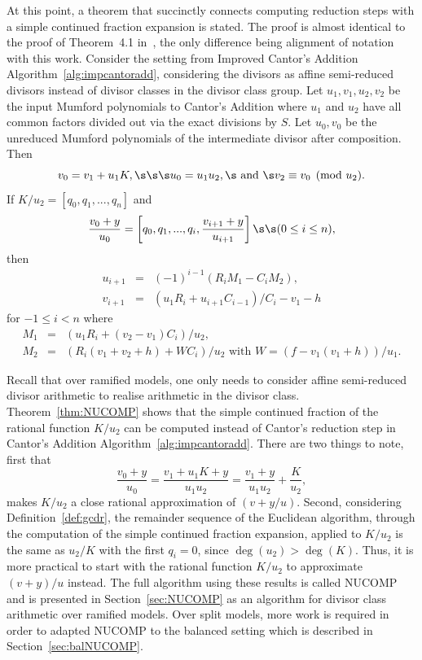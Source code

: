 At this point, a theorem that succinctly connects computing reduction steps with
a simple continued fraction expansion is stated. The proof is almost identical
to the proof of Theorem~4.1 in~\cite{ImbertJacobsonSchmidt_NUCOMP_2010}, the
only difference being alignment of notation with this work.
\bt\label{thm:NUCOMP} \cite[Adapted from
Theorem~4.1]{ImbertJacobsonSchmidt_NUCOMP_2010} Consider the setting from
Improved Cantor's Addition Algorithm~\ref{alg:impcantoradd}, considering the
divisors as affine semi-reduced divisors instead of divisor classes in the
divisor class group. Let $u_1,v_1, u_2,v_2$ be the input Mumford polynomials to
Cantor's Addition where $u_1$ and $u_2$ have all common factors divided out via
the exact divisions by $S$. Let $u_0,v_0$ be the unreduced Mumford polynomials of
the intermediate divisor after composition. Then
\begin{equation*}
v_0 = v_1 + u_1K, \s\s\s u_0 = u_1u_2, \s\mbox{ and }\s v_2 \equiv v_0 \pmod{u_2}.
\end{equation*} If $K/u_2 = [q_0,q_1,...,q_n]$ and \begin{equation*}
    \frac{v_0 + y}{u_0} = \left[q_0,q_1,...,q_i,\frac{v_{i+1} + y}{u_{i+1}}\right] \s\s (0 \leq i \leq n),
\end{equation*} then \begin{eqnarray*}
    u_{i+1} &=& (-1)^{i-1}(R_iM_1 - C_iM_2),\\
    v_{i+1} &=& (u_1R_i + u_{i+1}C_{i-1})/C_i - v_1 - h
\end{eqnarray*} for $-1 \leq i < n$ where \begin{eqnarray*}
    M_1 &=& (u_1R_i + (v_2 - v_1)C_i)/u_2,\\
    M_2 &=& (R_i(v_1 + v_2 + h) + WC_i)/u_2 \mbox{ with } W = (f - v_1(v_1 + h))/u_1. 
\end{eqnarray*}
\et

Recall that over ramified models, one only needs to consider affine
semi-reduced divisor arithmetic to realise arithmetic in the divisor class.
Theorem~\ref{thm:NUCOMP} shows that the simple continued fraction of the
rational function $K/u_2$ can be computed instead of Cantor's reduction step in
Cantor's Addition Algorithm~\ref{alg:impcantoradd}. There are two things to
note, first that $$\frac{v_0 + y}{u_0} = \frac{v_1 + u_1K + y}{u_1u_2} =
\frac{v_1 + y}{u_1u_2} + \frac{K}{u_2},$$ makes $K/u_2$ a close rational
approximation of $(v + y/u)$. Second, considering Definition~\ref{def:gcdr}, the
remainder sequence of the Euclidean algorithm, through the computation of the
simple continued fraction expansion, applied to $K/u_2$ is the same as $u_2/K$
with the first $q_i = 0$, since $\deg(u_2) > \deg(K)$. Thus, it is more
practical to start with the rational function $K/u_2$ to approximate $(v+y)/u$
instead. The full algorithm using these results is called NUCOMP and is
presented in Section~\ref{sec:NUCOMP} as an algorithm for divisor class
arithmetic over ramified models. Over split models, more
work is required in order to adapted NUCOMP to the balanced setting which is
described in Section~\ref{sec:balNUCOMP}.

